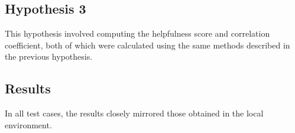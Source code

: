 \subsection*{Hypothesis 3}
This hypothesis involved computing the helpfulness score and correlation coefficient, both of which were calculated using the same methods
described in the previous hypothesis.

\subsection*{Results}
In all test cases, the results closely mirrored those obtained in the local environment.


